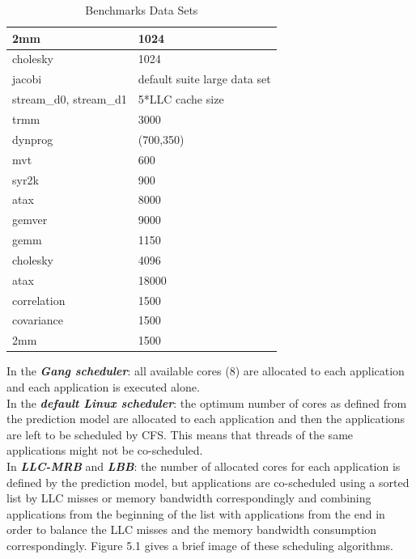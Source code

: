 \documentclass[diploma]{Styles/softlab-thesis}
\begin{document}
\begin{table}[h]
\begin{center}
\caption{Benchmarks Data Sets}
\begin{tabular}{ | l | l | }
    \hline
    2mm & 1024 \\ \hline
    cholesky & 1024 \\ \hline
    jacobi & default suite large data set \\ \hline
    stream\_d0, stream\_d1 & 5*LLC cache size  \\ \hline
    trmm & 3000 \\ \hline
    dynprog & (700,350) \\ \hline
    mvt & 600 \\ \hline
    syr2k & 900 \\ \hline
    atax & 8000 \\ \hline
    gemver & 9000 \\ \hline
    gemm & 1150 \\ \hline
    cholesky & 4096 \\ \hline
    atax & 18000 \\ \hline
    correlation & 1500 \\ \hline
    covariance & 1500 \\ \hline
    2mm & 1500 \\ \hline
\end{tabular}
\end{center}
\end{table}


In the \textit{\textbf{Gang scheduler}}: all available cores (8) are allocated to each application and each application is executed alone. \\

In the \textit{\textbf{default Linux scheduler}}: the optimum number of cores as defined from the prediction model are allocated to each application and then the applications are left to be scheduled by CFS. This means that threads of the same applications might not be co-scheduled. \\

In \textit{\textbf{LLC-MRB}} and \textit{\textbf{LBB}}: the number of allocated cores for each application is defined by the prediction model, but applications are co-scheduled using a sorted list by LLC misses or memory bandwidth correspondingly and combining applications from the beginning of the list with applications from the end in order to balance the LLC misses and the memory bandwidth consumption correspondingly. Figure 5.1 gives a brief image of these scheduling algorithms.\\
\end{document}
